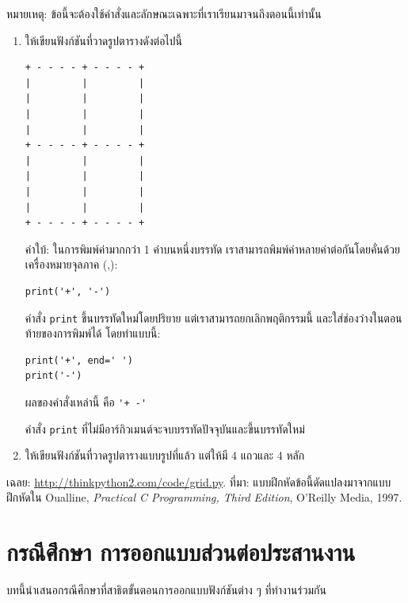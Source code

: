 \begin{exercise}

หมายเหตุ: ข้อนี้จะต้องใช้คำสั่งและลักษณะเฉพาะที่เราเรียนมาจนถึงตอนนี้เท่านั้น  

\begin{enumerate}

\item ให้เขียนฟังก์ชันที่วาดรูปตารางดังต่อไปนี้

\begin{verbatim}
+ - - - - + - - - - +
|         |         |
|         |         |
|         |         |
|         |         |
+ - - - - + - - - - +
|         |         |
|         |         |
|         |         |
|         |         |
+ - - - - + - - - - +
\end{verbatim}
% 
คำใบ้: ในการพิมพ์ค่ามากกว่า 1 ค่าบนหนึ่งบรรทัด เราสามารถพิมพ์ค่าหลายค่าต่อกันโดยคั่นด้วยเครื่องหมายจุลภาค (,):

\begin{verbatim}
print('+', '-')
\end{verbatim}
%
คำสั่ง {\tt print} ขึ้นบรรทัดใหม่โดยปริยาย แต่เราสามารถยกเลิกพฤติกรรมนี้
และใส่ช่องว่างในตอนท้ายของการพิมพ์ได้ โดยทำแบบนี้:

\begin{verbatim}
print('+', end=' ')
print('-')
\end{verbatim}
%
ผลของคำสั่งเหล่านี้ คือ \verb"'+ -'"

คำสั่ง {\tt print} ที่ไม่มีอาร์กิวเมนต์จะจบบรรทัดปัจจุบันและขึ้นบรรทัดใหม่

\item ให้เขียนฟังก์ชันที่วาดรูปตารางแบบรูปที่แล้ว แต่ให้มี 4 แถวและ 4 หลัก

\end{enumerate}

เฉลย: \url{http://thinkpython2.com/code/grid.py}.
ที่มา: แบบฝึกหัดข้อนี้ดัดแปลงมาจากแบบฝึกหัดใน Oualline, {\em
Practical C Programming, Third Edition}, O'Reilly Media, 1997.

\end{exercise}




\chapter{กรณีศึกษา การออกแบบส่วนต่อประสานงาน }%
\label{turtlechap}

บทนี้นำเสนอกรณีศึกษาที่สาธิตขั้นตอนการออกแบบฟังก์ชันต่าง ๆ ที่ทำงานร่วมกัน

